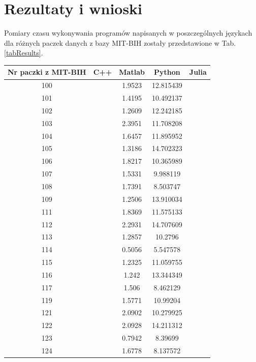 \section{Rezultaty i wnioski}


Pomiary czasu wykonywania programów napisanych w poszczególnych językach dla różnych paczek danych z bazy MIT-BIH zostały przedstawione w Tab.\ref{tabResults}.

\begin{table}[!tp]
	\centering
	\caption{Czasy wykonywania programu w poszczególnych językach dla różnych paczek danych. Wyniki wyrażone w sekundach}
	\label{tabResults}
	\begin{longtable}{|c|c|c|c|c|}
		\hline
		Nr paczki z MIT-BIH & C++ & Matlab & Python & Julia\\ \hline		
		100 & & 1.9523 & 12.815439 & \\ \hline
		101 & & 1.4195 & 10.492137 & \\ \hline
		102 & & 1.2609 & 12.242185 & \\ \hline
		103 & & 2.3951 & 11.708208 & \\ \hline
		104 & & 1.6457 & 11.895952 & \\ \hline
		105 & & 1.3186 & 14.702323 & \\ \hline
		106 & & 1.8217 & 10.365989 & \\ \hline
		107 & & 1.5331 &  9.988119 & \\ \hline
		108 & & 1.7391 &  8.503747 & \\ \hline
		109 & & 1.2506 & 13.910034 & \\ \hline
		111 & & 1.8369 & 11.575133 & \\ \hline
		112 & & 2.2931 & 14.707609 & \\ \hline
		113 & & 1.2857 & 10.2796   & \\ \hline
		114 & & 0.5056 &  5.547578 & \\ \hline
		115 & & 1.2325 & 11.059755 & \\ \hline
		116 & & 1.242  & 13.344349 & \\ \hline
		117 & & 1.506  &  8.462129 & \\ \hline
		119 & & 1.5771 & 10.99204  & \\ \hline
		121 & & 2.0902 & 10.279925 & \\ \hline
		122 & & 2.0928 & 14.211312 & \\ \hline
		123 & & 0.7942 &  8.39699  & \\ \hline
		124 & & 1.6778 &  8.137572 & \\ \hline

\end{longtable}
\end{table}
